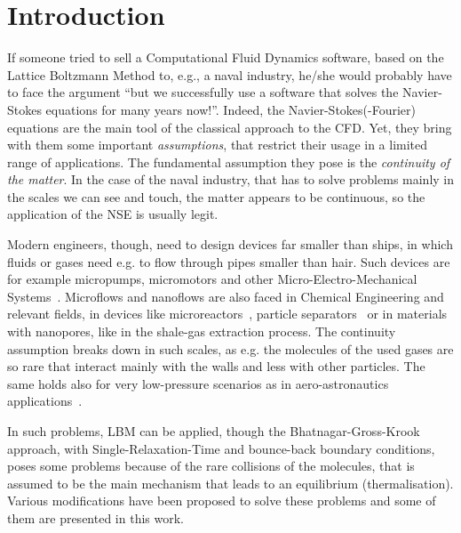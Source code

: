 \section{Introduction}
If someone tried to sell a Computational Fluid Dynamics software, based on
the Lattice Boltzmann Method to, e.g., a naval industry, he/she 
would probably have to face the argument ``but we successfully use a
software that solves the Navier-Stokes equations for many years now!''.
Indeed, the Navier-Stokes(-Fourier) equations are the main tool of the classical approach
to the CFD. Yet, they bring with them some important \textit{assumptions}, that restrict
their usage in a limited range of applications. The fundamental assumption they
pose is the \textit{continuity of the matter}. In the case of the naval industry,
that has to solve problems mainly in the scales we can see and touch, the matter
appears to be continuous, so the application of the NSE is usually legit. 

Modern engineers, though, need to design devices far smaller than ships, in which
fluids or gases need e.g. to flow through pipes smaller than hair. Such devices
are for example micropumps, micromotors and other Micro-Electro-Mechanical 
Systems~\cite{Karniadakis_Microflows}. Microflows and nanoflows are also faced 
in Chemical Engineering and relevant fields, in devices like microreactors~\cite{Neumann2012},
particle separators~\cite{Karniadakis_Microflows} or in materials with nanopores, 
like in the shale-gas extraction process. 
The continuity assumption breaks down in
such scales, as e.g. the molecules of the used gases are so rare that interact
mainly with the walls and less with other particles. The same holds also for
very low-pressure scenarios as in aero-astronautics applications~\cite{Toschi2005}.

In such problems, LBM can be applied, though the Bhatnagar-Gross-Krook approach, with Single-Relaxation-Time
and bounce-back boundary conditions,
poses some problems because of the rare collisions of the molecules, that is
assumed to be the main mechanism that leads to an equilibrium (thermalisation). Various
modifications have been proposed to solve these problems and some of them are 
presented in this work.